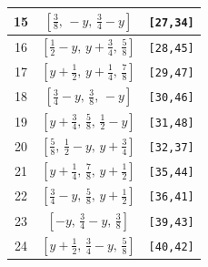 \documentclass[fleqn,8pt]{jsarticle}
\begin{document}
\begin{longtable}{ccc}
15 & $\left[ \frac{3}{8},\, - y,\, \frac{3}{4} - y \right]$ & {\tt [27,34]} \\ \hline
16 & $\left[ \frac{1}{2} - y,\, y + \frac{3}{4},\, \frac{5}{8} \right]$ & {\tt [28,45]} \\ \hline
17 & $\left[ y + \frac{1}{2},\, y + \frac{1}{4},\, \frac{7}{8} \right]$ & {\tt [29,47]} \\ \hline
18 & $\left[ \frac{3}{4} - y,\, \frac{3}{8},\, - y \right]$ & {\tt [30,46]} \\ \hline
19 & $\left[ y + \frac{3}{4},\, \frac{5}{8},\, \frac{1}{2} - y \right]$ & {\tt [31,48]} \\ \hline
20 & $\left[ \frac{5}{8},\, \frac{1}{2} - y,\, y + \frac{3}{4} \right]$ & {\tt [32,37]} \\ \hline
21 & $\left[ y + \frac{1}{4},\, \frac{7}{8},\, y + \frac{1}{2} \right]$ & {\tt [35,44]} \\ \hline
22 & $\left[ \frac{3}{4} - y,\, \frac{5}{8},\, y + \frac{1}{2} \right]$ & {\tt [36,41]} \\ \hline
23 & $\left[ - y,\, \frac{3}{4} - y,\, \frac{3}{8} \right]$ & {\tt [39,43]} \\ \hline
24 & $\left[ y + \frac{1}{2},\, \frac{3}{4} - y,\, \frac{5}{8} \right]$ & {\tt [40,42]} \\
\end{longtable}
\renewcommand{\arraystretch}{1.2}
\end{document}
